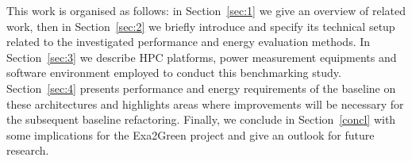 This work is  organised as follows: in Section~\ref{sec:1}  we give an
overview  of  related work,  then  in  Section~\ref{sec:2} we  briefly
introduce  \cosmoart and specify  its technical  setup related  to the
investigated   performance   and   energy  evaluation   methods.    In
Section~\ref{sec:3}  we  describe  HPC  platforms,  power  measurement
equipments   and  software  environment   employed  to   conduct  this
benchmarking  study.   Section~\ref{sec:4}  presents  performance  and
energy  requirements  of  the  baseline  on  these  architectures  and
highlights  areas  where  improvements   will  be  necessary  for  the
subsequent   baseline   refactoring.     Finally,   we   conclude   in
Section~\ref{concl} with  some implications for  the Exa2Green project
and give an outlook for future research.


